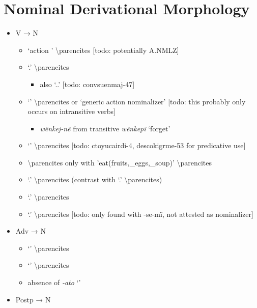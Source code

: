 \documentclass{memoir}
\begin{document}
\section{\texorpdfstring{Nominal Derivational Morphology
\label{sec:nounderiv}}{Nominal Derivational Morphology }}

\begin{itemize}
\tightlist
\item
  V → N

  \begin{itemize}
  \tightlist
  \item
     `action ' \textbackslash parencites {[}todo:
    potentially A.NMLZ{]}
  \item
     `.' \textbackslash parencites

    \begin{itemize}
    \tightlist
    \item
      also `..' {[}todo: convsuenmaj-47{]}
    \end{itemize}
  \item
     `' \textbackslash parencites or `generic action
    nominalizer' {[}todo: this probably only occurs on intransitive
    verbs{]}

    \begin{itemize}
    \tightlist
    \item
      \emph{wënkej-në} from transitive \emph{wënkepï} `forget'
    \end{itemize}
  \item
     `' \textbackslash parencites {[}todo:
    ctoyucairdi-4, descokigrme-53 for predicative use{]}
  \item
     \parencitesV{} \textbackslash parencites only with
     'eat(fruits,\_eggs,\_soup)' \textbackslash parencites
  \item
     `.' \textbackslash parencites (contrast
    with  `.' \textbackslash parencites)
  \item
     `.' \textbackslash parencites
  \item
     `.' \textbackslash parencites {[}todo:
    only found with -se-mï, not attested as nominalizer{]}
  \end{itemize}
\item
  Adv → N

  \begin{itemize}
  \tightlist
  \item
     `' \textbackslash parencites
  \item
     `' \textbackslash parencites
  \item
    absence of \emph{-ato} `'
  \end{itemize}
\item
  Postp → N


\end{itemize}
\end{document}
